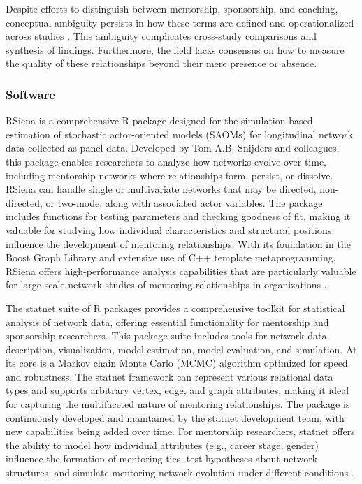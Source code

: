 \documentclass[main.tex]{subfiles}
\begin{document}
Despite efforts to distinguish between mentorship, sponsorship, and coaching, conceptual ambiguity persists in how these terms are defined and operationalized across studies \parencite{alachkar2023sponsor, rsna2021mentorship}. This ambiguity complicates cross-study comparisons and synthesis of findings. Furthermore, the field lacks consensus on how to measure the quality of these relationships beyond their mere presence or absence.

\subsubsection{Software}

RSiena is a comprehensive R package designed for the simulation-based estimation of stochastic actor-oriented models (SAOMs) for longitudinal network data collected as panel data. Developed by Tom A.B. Snijders and colleagues, this package enables researchers to analyze how networks evolve over time, including mentorship networks where relationships form, persist, or dissolve. RSiena can handle single or multivariate networks that may be directed, non-directed, or two-mode, along with associated actor variables. The package includes functions for testing parameters and checking goodness of fit, making it valuable for studying how individual characteristics and structural positions influence the development of mentoring relationships. With its foundation in the Boost Graph Library and extensive use of C++ template metaprogramming, RSiena offers high-performance analysis capabilities that are particularly valuable for large-scale network studies of mentoring relationships in organizations \parencite{cran2023rsiena}.

The statnet suite of R packages provides a comprehensive toolkit for statistical analysis of network data, offering essential functionality for mentorship and sponsorship researchers. This package suite includes tools for network data description, visualization, model estimation, model evaluation, and simulation. At its core is a Markov chain Monte Carlo (MCMC) algorithm optimized for speed and robustness. The statnet framework can represent various relational data types and supports arbitrary vertex, edge, and graph attributes, making it ideal for capturing the multifaceted nature of mentoring relationships. The package is continuously developed and maintained by the statnet development team, with new capabilities being added over time. For mentorship researchers, statnet offers the ability to model how individual attributes (e.g., career stage, gender) influence the formation of mentoring ties, test hypotheses about network structures, and simulate mentoring network evolution under different conditions \parencite{cran2023statnet}.
\end{document}
